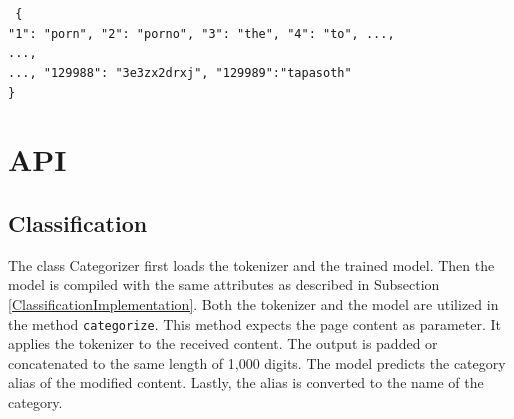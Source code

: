 \begin{appendices}
\texttt{
\{\\
\text{    }"1": "porn", "2": "porno", "3": "the", "4": "to", ...,\\
    ...,\\
    ..., "129988": "3e3zx2drxj", "129989":"tapasoth"\\
\}}

\section{API}
\subsection{Classification} \label{dixApClassification}
The class Categorizer first loads the tokenizer and the trained model. Then the model is compiled with the same attributes as described in Subsection \ref{ClassificationImplementation}. Both the tokenizer and the model are utilized in the method \texttt{categorize}. This method expects the page content as parameter. It applies the tokenizer to the received content. The output is padded or concatenated to the same length of 1,000 digits. The model predicts the category alias of the modified content. Lastly, the alias is converted to the name of the category.
\FloatBarrier 


\end{appendices}
